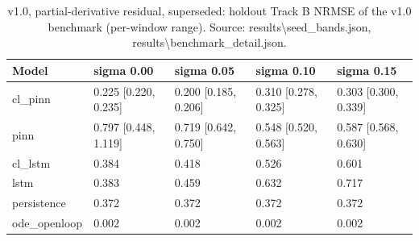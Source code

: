\begin{table}[t]
\centering
\caption{v1.0, partial-derivative residual, superseded: holdout Track B NRMSE of the v1.0 benchmark (per-window range). Source: results\textbackslash{}seed\_bands.json, results\textbackslash{}benchmark\_detail.json.}
\label{tab:si-v10}
\footnotesize
\begin{tabular}{lllll}
\toprule
Model & sigma 0.00 & sigma 0.05 & sigma 0.10 & sigma 0.15 \\
\midrule
cl\_pinn & 0.225 [0.220, 0.235] & 0.200 [0.185, 0.206] & 0.310 [0.278, 0.325] & 0.303 [0.300, 0.339] \\
pinn & 0.797 [0.448, 1.119] & 0.719 [0.642, 0.750] & 0.548 [0.520, 0.563] & 0.587 [0.568, 0.630] \\
cl\_lstm & 0.384 & 0.418 & 0.526 & 0.601 \\
lstm & 0.383 & 0.459 & 0.632 & 0.717 \\
persistence & 0.372 & 0.372 & 0.372 & 0.372 \\
ode\_openloop & 0.002 & 0.002 & 0.002 & 0.002 \\
\bottomrule
\end{tabular}
\end{table}
